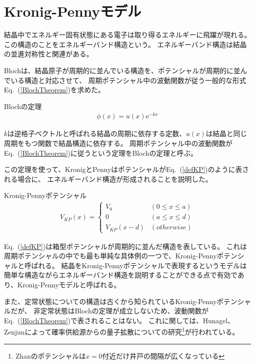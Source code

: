 \documentclass[autodetect-engine,dvipdfmx-if-dvi,ja=standard,a4paper,layout=v2]{bxjsreport}
\newcommand{\eref}[1]{Eq.~(\ref{#1})}
\begin{document}
    \section{Kronig-Pennyモデル}
    結晶中でエネルギー固有状態にある電子は取り得るエネルギーに飛躍が現れる。
    この構造のことをエネルギーバンド構造という。
    エネルギーバンド構造は結晶の並進対称性と関連がある。\par
    Blochは、結晶原子が周期的に並んでいる構造を、ポテンシャルが周期的に並んでいる構造と対応させて、
    周期ポテンシャル中の波動関数が従う一般的な形式\eref{BlochTheorem}を求めた。
    \begin{itembox}[l]{Blochの定理}
      \begin{align}
        \phi(x) = u(x) \mathrm{e}^{-k x} \label{BlochTheorem}
      \end{align}
    \end{itembox}
    $k$は逆格子ベクトルと呼ばれる結晶の周期に依存する定数、$u(x)$は結晶と同じ周期をもつ関数で結晶構造に依存する。
    周期ポテンシャル中の波動関数が\eref{BlochTheorem}に従うという定理をBlochの定理と呼ぶ。\par
    この定理を使って、KronigとPennyはポテンシャルが\eref{defKP}のように表される場合に、
    エネルギーバンド構造が形成されることを説明した。
    \begin{itembox}[l]{Kronig-Pennyポテンシャル}
    \begin{align}
        V_{KP}(x) =
        \begin{cases}
          V_0  & (0 \leq x \leq a)\\
          0    & (a \leq x \leq d)\\
          V_{KP}(x - d) & (otherwise)
        \end{cases}\label{defKP}
      \end{align}
    \end{itembox}
    \eref{defKP}は箱型ポテンシャルが周期的に並んだ構造を表している。
    これは周期ポテンシャルの中でも最も単純な具体例の一つで、Kronig-Pennyポテンシャルと呼ばれる。
    結晶をKronig-Pennyポテンシャルで表現するというモデルは
    簡単な構造ながらエネルギーバンド構造を説明することができる点で有効であり、Kronig-Pennyモデルと呼ばれる。\par
    また、定常状態についての構造は古くから知られているKronig-Pennyポテンシャルだが、
    非定常状態はBlochの定理が成立しないため、波動関数が\eref{BlochTheorem}で表されることはない。
    これに関しては、Hunagel、Zenjunによって確率供給源からの量子拡散についての研究\footnote{
      Zhanのポテンシャルは$x=0$付近だけ井戸の間隔が広くなっている
    }が行われている。
\end{document}
